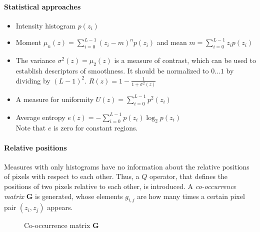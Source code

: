 \paragraph{Statistical approaches}
\begin{itemize}
\item Intensity histogram $p(z_i)$
\item Moment $\mu_n(z)=\sum\limits_{i=0}^{L-1}(z_i-m)^np(z_i)$ and mean $m=\sum\limits_{i=0}^{L-1}z_ip(z_i)$
\item The variance $\sigma ^2(z) =\mu_2 (z)$ is a measure of contrast, which can be used to establish descriptors of smoothness. It should be normalized to $0 \ldots 1$ by dividing by $\left(L-1\right)^2$. $R(z)=1-\frac{1}{1+\sigma ^2(z)}$
\item A measure for uniformity $U(z)=\sum\limits_{i=0}^{L-1}p^2(z_i)$
\item Average entropy $e(z)=-\sum\limits_{i=0}^{L-1}p(z_i)\log_2p(z_i)$ \\ Note that $e$ is zero for constant regions.
\end{itemize}

\paragraph{Relative positions} Measures with only histograms have no information about the relative positions of pixels with respect to each other.
Thus, a $Q$ operator, that defines the positions of two pixels relative to each other, is introduced.
A \emph{co-occurrence matrix} $\mathbf{G}$ is generated, whose elements $g_{i,j}$ are how many times a certain pixel pair $(z_i,z_j)$ appears. \\

\begin{figure}[h]
	\centering
	
	\caption{Co-occurrence matrix $\mathbf{G}$}
\end{figure}

